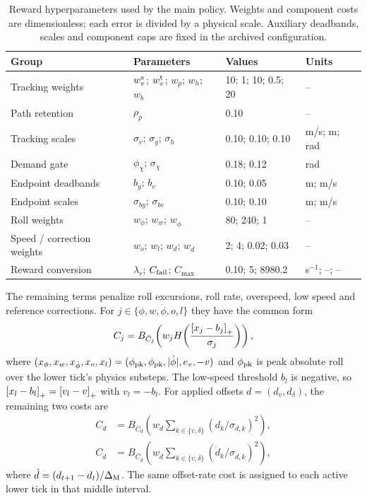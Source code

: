 \begin{table}[t]
\centering\small\setlength{\tabcolsep}{5pt}
\caption{Reward hyperparameters used by the main policy. Weights and component costs are dimensionless; each error is divided by a physical scale. Auxiliary deadbands, scales and component caps are fixed in the archived configuration.}
\label{tab:rewardparams}
\begin{tabular}{@{}llll@{}}
\toprule
Group & Parameters & Values & Units\\
\midrule
Tracking weights & $w_v^{\rm s}$; $w_v^{\rm t}$; $w_p$; $w_h$; $w_b$ & 10; 1; 10; 0.5; 20 & --\\
Path retention & $\rho_p$ & 0.10 & --\\
Tracking scales & $\sigma_v$; $\sigma_y$; $\sigma_h$ & 0.10; 0.10; 0.10 & m/s; m; rad\\
Demand gate & $\phi_\chi$; $\sigma_\chi$ & 0.18; 0.12 & rad\\
Endpoint deadbands & $b_y$; $b_v$ & 0.10; 0.05 & m; m/s\\
Endpoint scales & $\sigma_{by}$; $\sigma_{bv}$ & 0.10; 0.10 & m; m/s\\
Roll weights & $w_\phi$; $w_w$; $w_{\dot\phi}$ & 80; 240; 1 & --\\
Speed / correction weights & $w_o$; $w_l$; $w_d$; $w_{\dot d}$ & 2; 4; 0.02; 0.03 & --\\
Reward conversion & $\lambda_r$; $C_{\rm fail}$; $C_{\max}$ & 0.10; 5; 8980.2 & s$^{-1}$; --; --\\
\bottomrule
\end{tabular}
\end{table}

The remaining terms penalize roll excursions, roll rate, overspeed, low speed and reference corrections. For $j\in\{\phi,w,\dot\phi,o,l\}$ they have the common form
\begin{equation}
 C_j=B_{\bar C_j}\!\left(w_j H\!\left(\frac{\left[x_j-b_j\right]_+}{\sigma_j}\right)\right),
\label{eq:auxcost}
\end{equation}
where $(x_\phi,x_w,x_{\dot\phi},x_o,x_l)=(\phi_{\rm pk},\phi_{\rm pk},|\dot\phi|,e_v,-v)$ and $\phi_{\rm pk}$ is peak absolute roll over the lower tick's physics substeps. The low-speed threshold $b_l$ is negative, so $\left[x_l-b_l\right]_+=\left[v_l-v\right]_+$ with $v_l=-b_l$. For applied offsets $d=(d_v,d_\delta)$, the remaining two costs are
\begin{align}
 C_d&=B_{\bar C_d}\!\left(w_d\sum_{k\in\{v,\delta\}}(d_k/\sigma_{d,k})^2\right),\\
 C_{\dot d}&=B_{\bar C_{\dot d}}\!\left(w_{\dot d}\sum_{k\in\{v,\delta\}}(\dot d_k/\sigma_{\dot d,k})^2\right),
\end{align}
where $\dot d=(d_{t+1}-d_t)/\Delta_{\rm M}$. The same offset-rate cost is assigned to each active lower tick in that middle interval.

